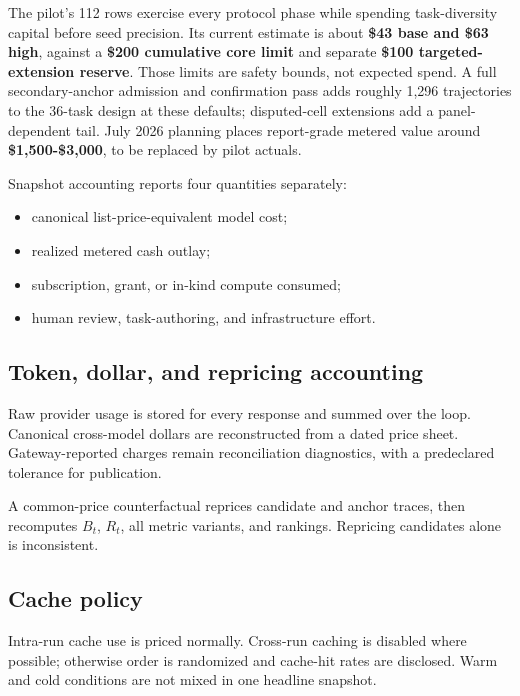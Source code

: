 \documentclass[11pt]{article}
\begin{document}
The pilot's 112 rows exercise every protocol phase while spending task-diversity capital before seed precision. Its current estimate is about \textbf{\$43 base and \$63 high}, against a \textbf{\$200 cumulative core limit} and separate \textbf{\$100 targeted-extension reserve}. Those limits are safety bounds, not expected spend. A full secondary-anchor admission and confirmation pass adds roughly 1,296 trajectories to the 36-task design at these defaults; disputed-cell extensions add a panel-dependent tail. July 2026 planning places report-grade metered value around \textbf{\$1,500-\$3,000}, to be replaced by pilot actuals.

Snapshot accounting reports four quantities separately:

\begin{itemize}
\item{} canonical list-price-equivalent model cost;
\item{} realized metered cash outlay;
\item{} subscription, grant, or in-kind compute consumed;
\item{} human review, task-authoring, and infrastructure effort.
\end{itemize}

\subsection{Token, dollar, and repricing accounting}\hypertarget{106-token-dollar-and-repricing-accounting}{}\label{106-token-dollar-and-repricing-accounting}

Raw provider usage is stored for every response and summed over the loop. Canonical cross-model dollars are reconstructed from a dated price sheet. Gateway-reported charges remain reconciliation diagnostics, with a predeclared tolerance for publication.

A common-price counterfactual reprices candidate and anchor traces, then recomputes $B_t$, $R_t$, all metric variants, and rankings. Repricing candidates alone is inconsistent.

\subsection{Cache policy}\hypertarget{107-cache-policy}{}\label{107-cache-policy}

Intra-run cache use is priced normally. Cross-run caching is disabled where possible; otherwise order is randomized and cache-hit rates are disclosed. Warm and cold conditions are not mixed in one headline snapshot.
\end{document}
